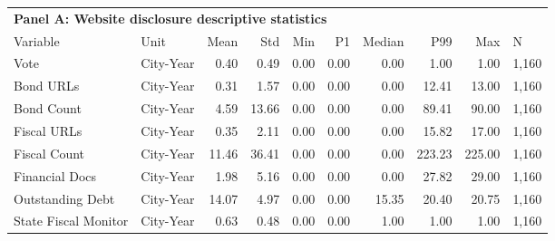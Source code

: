 \begin{table}[H]
\centering
\begin{tabular*}{\textwidth}{@{\extracolsep{\fill}}llrrrrrrrl}
\multicolumn{10}{l}{\textbf{Panel A: Website disclosure descriptive statistics}}\\

\addlinespace
  \toprule
Variable & Unit & Mean & Std & Min & P1 & Median & P99 & Max & N \\ 
  \hline
Vote & City-Year & 0.40 & 0.49 & 0.00 & 0.00 & 0.00 & 1.00 & 1.00 & 1,160 \\ 
  Bond URLs & City-Year & 0.31 & 1.57 & 0.00 & 0.00 & 0.00 & 12.41 & 13.00 & 1,160 \\ 
  Bond Count & City-Year & 4.59 & 13.66 & 0.00 & 0.00 & 0.00 & 89.41 & 90.00 & 1,160 \\ 
  Fiscal URLs & City-Year & 0.35 & 2.11 & 0.00 & 0.00 & 0.00 & 15.82 & 17.00 & 1,160 \\ 
  Fiscal Count & City-Year & 11.46 & 36.41 & 0.00 & 0.00 & 0.00 & 223.23 & 225.00 & 1,160 \\ 
  Financial Docs & City-Year & 1.98 & 5.16 & 0.00 & 0.00 & 0.00 & 27.82 & 29.00 & 1,160 \\ 
  Outstanding Debt & City-Year & 14.07 & 4.97 & 0.00 & 0.00 & 15.35 & 20.40 & 20.75 & 1,160 \\ 
  State Fiscal Monitor & City-Year & 0.63 & 0.48 & 0.00 & 0.00 & 1.00 & 1.00 & 1.00 & 1,160 \\ 
   \hline
\end{tabular*}
\end{table}
